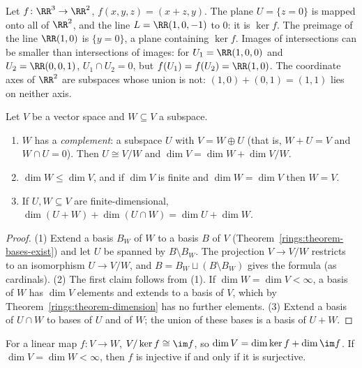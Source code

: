 \begin{example}\label{linear-algebra:example-images-subspaces}
Let $f \colon \RR^3 \to \RR^2$, $f(x, y, z) = (x + z, y)$. The plane $U = \{z = 0\}$ is mapped onto all of $\RR^2$, and the line $L = \RR(1, 0, -1)$ to $0$: it is $\ker f$. The preimage of the line $\RR(1, 0)$ is
$\{y = 0\}$, a plane containing $\ker f$. Images of intersections can be smaller than intersections of images: for $U_1 = \RR(1, 0, 0)$ and $U_2 = \RR(0, 0, 1)$, $U_1 \cap U_2 = 0$, but
$f(U_1) = f(U_2) = \RR(1, 0)$. The coordinate axes of $\RR^2$ are subspaces whose union is not: $(1, 0) + (0, 1) = (1, 1)$ lies on neither axis.
\end{example}

\begin{proposition}\label{linear-algebra:proposition-subspaces}
Let $V$ be a vector space and $W \subseteq V$ a subspace.
\begin{enumerate}
\item $W$ has a \emph{complement}: a subspace $U$ with $V = W \oplus U$ (that is, $W + U = V$ and
$W \cap U = 0$). Then $U \cong V/W$ and $\dim V = \dim W + \dim V/W$.
\item $\dim W \leq \dim V$, and if $\dim V$ is finite and $\dim W = \dim V$ then $W = V$.
\item If $U, W \subseteq V$ are finite-dimensional, $\dim(U + W) + \dim(U \cap W) = \dim U + \dim W$.
\end{enumerate}
\end{proposition}

\begin{proof}
(1) Extend a basis $B_W$ of $W$ to a basis $B$ of $V$ (Theorem~\ref{rings:theorem-bases-exist}) and
let $U$ be spanned by $B \setminus B_W$. The projection $V \to V/W$ restricts to an isomorphism
$U \to V/W$, and $B = B_W \sqcup (B \setminus B_W)$ gives the formula (as cardinals).
(2) The first claim follows from (1). If $\dim W = \dim V < \infty$, a basis of $W$ has $\dim V$
elements and extends to a basis of $V$, which by Theorem~\ref{rings:theorem-dimension} has no
further elements.
(3) Extend a basis of $U \cap W$ to bases of $U$ and of $W$; the union of these bases is a basis of
$U + W$.
\end{proof}

\begin{theorem}\label{linear-algebra:theorem-rank-nullity}
For a linear map $f \colon V \to W$, $V/\ker f \cong \im f$, so
$\dim V = \dim \ker f + \dim \im f$. If $\dim V = \dim W < \infty$, then $f$ is injective if and
only if it is surjective.
\end{theorem}

